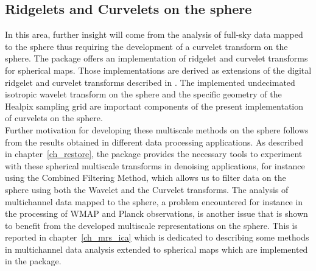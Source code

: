 \subsection{Ridgelets and Curvelets on the sphere}
In this area, further insight will come from the analysis of full-sky data mapped to the sphere thus requiring the development of a curvelet 
transform on the sphere. The \mrs package offers an implementation of ridgelet and curvelet transforms for spherical maps. Those implementations 
are derived as extensions of the digital ridgelet and curvelet transforms described in \citep{starck:sta01_3}. The implemented undecimated isotropic 
wavelet transform on the sphere and the specific geometry of the Healpix sampling grid are important components of the present implementation of 
curvelets on the sphere. \\
 
Further motivation for developing these multiscale methods on the sphere follows from the results obtained in different data processing applications. 
As described in chapter~\ref{ch_restore}, the \mrs package provides the necessary tools to experiment with these  spherical multiscale transforms in 
denoising applications, for instance using the Combined Filtering Method, which allows us to filter data on the sphere using both the Wavelet and the 
Curvelet transforms. The analysis of multichannel data mapped to the sphere, a problem encountered for instance in the processing of WMAP and Planck 
observations, is another issue that is shown to benefit from the developed multiscale representations on the sphere. This is reported in chapter~\ref{ch_mrs_ica} 
which is dedicated to describing some methods in multichannel data analysis extended to spherical maps which are implemented in the \mrs package.  




 